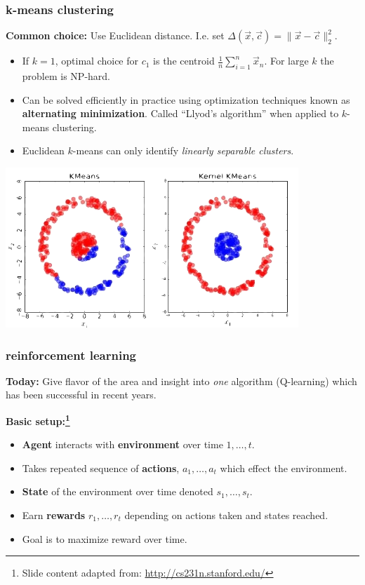 \documentclass[handout,compress]{beamer}
\begin{document}
\begin{frame}
	\frametitle{k-means clustering}
	\small
	\textbf{Common choice:} Use Euclidean distance. I.e. set $\Delta(\vec{x},\vec{c}) = \|\vec{x} - \vec{c}\|_2^2$.
	
	\begin{itemize}
		\item If $k = 1$, optimal choice for $c_1$ is the centroid $\frac{1}{n}\sum_{i=1}^n \vec{x}_n$. For large $k$ the problem is NP-hard.
		\item Can be solved efficiently in practice using optimization techniques known as \textbf{alternating minimization}. Called ``Llyod's algorithm'' when applied to $k$-means clustering. 
		\item Euclidean $k$-means can only identify \emph{linearly separable clusters}.
	\end{itemize}
	\begin{center}
	\includegraphics[width=.6\textwidth]{kmeans_vs_kernel.png}
\end{center}
\end{frame}

\begin{frame}
	\frametitle{reinforcement learning}
	\alert{\textbf{Today:} Give flavor of the area and insight into \emph{one} algorithm (Q-learning) which has been successful in recent years.}
	
	\textbf{Basic setup:\footnote{Slide content adapted from: \url{http://cs231n.stanford.edu/}}}
	\begin{itemize}
		\item \textbf{Agent} interacts with \textbf{environment} over time $1, \ldots, t$.
		\item Takes repeated sequence of \textbf{actions}, $a_1, \ldots, a_t$ which effect the environment.
		\item \textbf{State} of the environment over time denoted $s_1, \ldots, s_t$.
		\item Earn \textbf{rewards} $r_1, \ldots, r_t$ depending on actions taken and states reached.
		\item Goal is to maximize reward over time. 
	\end{itemize}
\end{frame}
\end{document}
